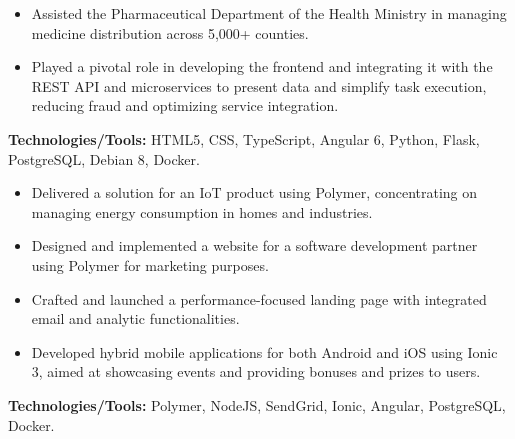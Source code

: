 \documentclass[10pt,a4paper]{altacv}
\begin{document}
\begin{itemize}
    \setlength{\itemindent}{0.5em}
    \item[--] Assisted the Pharmaceutical Department of the Health Ministry in managing medicine distribution across 5,000+ counties.
    \item[--] Played a pivotal role in developing the frontend and integrating it with the REST API and microservices to present data and simplify task execution, reducing fraud and optimizing service integration.
\end{itemize}
\textbf{Technologies/Tools:} HTML5, CSS, TypeScript, Angular 6, Python, Flask, PostgreSQL, Debian 8, Docker.
\vspace{5mm}

\begin{itemize}
    \setlength{\itemindent}{0.5em}
    \item[--] Delivered a solution for an IoT product using Polymer, concentrating on managing energy consumption in homes and industries.
    \item[--] Designed and implemented a website for a software development partner using Polymer for marketing purposes.
    \item[--] Crafted and launched a performance-focused landing page with integrated email and analytic functionalities.
    \item[--] Developed hybrid mobile applications for both Android and iOS using Ionic 3, aimed at showcasing events and providing bonuses and prizes to users.
\end{itemize}
\textbf{Technologies/Tools:} Polymer, NodeJS, SendGrid, Ionic, Angular, PostgreSQL, Docker.
\vspace{5mm}
\end{document}
